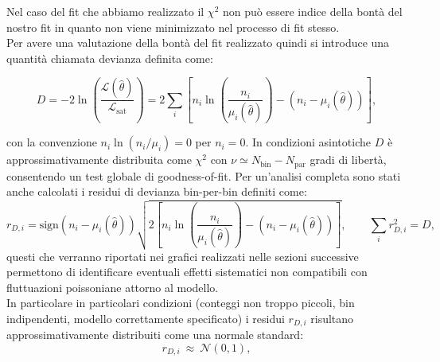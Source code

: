 \documentclass[10pt,a4paper]{article}
\begin{document}
\begin{flushleft}
Nel caso del fit che abbiamo realizzato il $\chi^2$ non può essere indice della bontà del nostro fit in quanto non viene minimizzato nel processo di fit stesso.\\
Per avere una valutazione della bontà del fit realizzato quindi si introduce una quantità chiamata devianza definita come:

\begin{equation}
\label{eq:deviance}
D = -2\ln\!\left(\frac{\mathcal{L}(\hat{\theta})}{\mathcal{L}_\mathrm{sat}}\right)
=2\sum_i \left[n_i\ln\!\left(\frac{n_i}{\mu_i(\hat{\theta})}\right)-(n_i-\mu_i(\hat{\theta}))\right],
\end{equation}

con la convenzione $n_i\ln(n_i/\mu_i)=0$ per $n_i=0$. In condizioni asintotiche $D$ è approssimativamente distribuita come $\chi^2$ con $\nu\simeq N_{\mathrm{bin}}-N_{\mathrm{par}}$ gradi di libertà, consentendo un test globale di goodness-of-fit. Per un'analisi completa sono stati anche calcolati i residui di devianza bin-per-bin definiti come:
\begin{equation}
\label{eq:residual}
r_{D,i}=\mathrm{sign}\!\left(n_i-\mu_i(\hat{\theta})\right)
\sqrt{2\left[n_i\ln\!\left(\frac{n_i}{\mu_i(\hat{\theta})}\right)-(n_i-\mu_i(\hat{\theta}))\right]},
\qquad \sum_i r_{D,i}^2 = D,
\end{equation}
questi che verranno riportati nei grafici realizzati nelle sezioni successive permettono di identificare eventuali effetti sistematici non compatibili con fluttuazioni poissoniane attorno al modello.\\
In particolare in particolari condizioni (conteggi non troppo piccoli, bin indipendenti, modello correttamente specificato) i residui $r_{D,i}$ risultano approssimativamente distribuiti come una normale standard:
\begin{equation}
\label{eq:res:dist}
r_{D,i}\ \approx\ \mathcal{N}(0,1),
\end{equation}


\end{flushleft}
\end{document}
